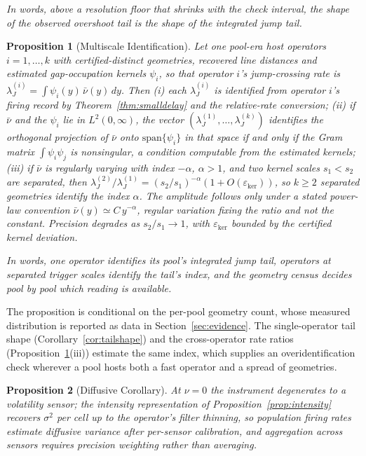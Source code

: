 \documentclass[11pt,a4paper]{article}
\theoremstyle{definition}
\theoremstyle{plain}
\newtheorem{proposition}{Proposition}
\theoremstyle{remark}
\begin{document}
\emph{In words, above a resolution floor that shrinks with the check interval, the shape of the observed overshoot tail is the shape of the integrated jump tail.}

\begin{proposition}[Multiscale Identification]\label{prop:multiscale}
Let one pool-era host operators $i = 1, \dots, k$ with certified-distinct geometries, recovered line distances and estimated gap-occupation kernels $\psi_i$, so that operator $i$'s
jump-crossing rate is $\lambda_J^{(i)} = \int \psi_i(y)\,
\bar\nu(y)\, dy$. Then (i) each $\lambda_J^{(i)}$ is identified from operator $i$'s firing record by Theorem~\ref{thm:smalldelay} and the relative-rate conversion; (ii) if $\bar\nu$ and 
the $\psi_i$ lie in $L^2(0, \infty)$, the vector $(\lambda_J^{(1)}, \dots,
\lambda_J^{(k)})$ identifies the orthogonal projection of $\bar\nu$
onto $\mathrm{span}\{\psi_i\}$ in that space if and only if the Gram matrix $\int \psi_i \psi_j$ is nonsingular, a condition computable from the estimated kernels; (iii) if $\bar\nu$ 
is regularly varying with index $-\alpha$, $\alpha > 1$, and two kernel scales $s_1 < s_2$ are separated, then $\lambda_J^{(2)}/\lambda_J^{(1)} = (s_2/s_1)^{-\alpha}(1 + O(\varepsilon_{\mathrm{ker}}))$, 
so $k \ge2$ separated geometries identify the index $\alpha$. The amplitude follows only under a stated power-law convention $\bar\nu(y) \simeq
C\,y^{-\alpha}$, regular variation fixing the ratio and not the constant. Precision degrades as $s_2/s_1 \to 1$, with $\varepsilon_{\mathrm{ker}}$ bounded by the certified kernel deviation.
\end{proposition}

\emph{In words, one operator identifies its pool's integrated jump tail, operators at separated trigger scales identify the tail's index, and the geometry census decides pool by pool which reading is
available.}

The proposition is conditional on the per-pool geometry count, whose measured distribution is reported as data in Section~\ref{sec:evidence}. The single-operator tail shape
(Corollary~\ref{cor:tailshape}) and the cross-operator rate ratios (Proposition~\ref{prop:multiscale}(iii)) estimate the same index, which supplies an overidentification check wherever a 
pool hosts both a fast operator and a spread of geometries.

\begin{proposition}[Diffusive Corollary]\label{prop:diffusive}
At $\nu = 0$ the instrument degenerates to a volatility sensor; the intensity representation of Proposition~\ref{prop:intensity} recovers $\sigma^2$
per cell up to the operator's filter thinning, so population firing rates estimate diffusive variance after per-sensor calibration, and aggregation across sensors requires precision weighting 
rather than averaging.
\end{proposition}
\end{document}

